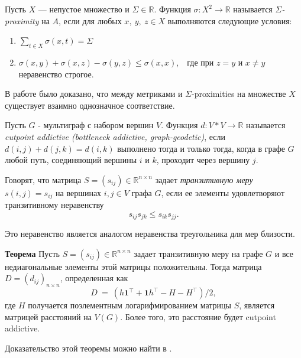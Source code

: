 \begin{definition}
Пусть $X$ --- непустое множество и $\Sigma \in \mathbb{R}$. Функция $\sigma: X^2 \rightarrow \mathbb{R}$ называется $\Sigma$\emph{-proximity} на $A$, если для любых $x,\ y,\ z \in X$ выполняются следующие условия:
\begin{enumerate}
\item $\sum\limits_{t \in X} \sigma (x,t) = \Sigma$
\item $\sigma(x,y) + \sigma(x,z) - \sigma(y,z) \le \sigma(x,x)$,\ \  где при $z = y$ и $x \ne y$ неравенство строгое.
\end{enumerate}
\end{definition}

В работе \cite{chebotarev2013studying} было доказано, что между метриками и $\Sigma$-proximities на множестве $X$ существует взаимно однозначное соответствие.

\begin{definition}
Пусть $G$ - мультиграф с набором вершин $V$. Функция $d: V*V \rightarrow \mathbb{R}$ называется \emph{cutpoint addictive (bottleneck addictive, graph-geodetic)}, если $d(i,j)+d(j,k) = d(i,k)$ выполнено тогда и только тогда, когда в графе $G$ любой путь, соединяющий вершины $i$ и $k$, проходит через вершину $j$.
\end{definition}

\begin{definition}
Говорят, что матрица $S=(s_{ij}) \in \mathbb{R}^{n\times n}$ задает \emph{транзитивную меру} $s(i,j) = s_{ij}$ на вершинах $i,j \in V$ графа $G$, если ее элементы удовлетворяют транзитивному неравенству $$s_{ij}s_{jk} \le s_{ik}s_{jj}.$$

Это неравенство является аналогом неравенства треугольника для мер близости.
\end{definition}
\textbf{Теорема}
Пусть $S=(s_{ij}) \in \mathbb{R}^{n\times n}$ задает транзитивную меру на графе $G$ и все недиагональные элементы этой матрицы положительны. Тогда матрица $D = (d_{ij})_{n\times n}$, определенная как
$$D~=~(h \textbf{1}^\intercal + \textbf{1} h^\intercal - H - H ^\intercal) /2,$$ 
где $H$ получается поэлементным логарифмированием матрицы $S$, является матрицей расстояний на $V(G)$. Более того, это расстояние будет cutpoint addictive.

Доказательство этой теоремы можно найти в \cite{von2014hitting}.



